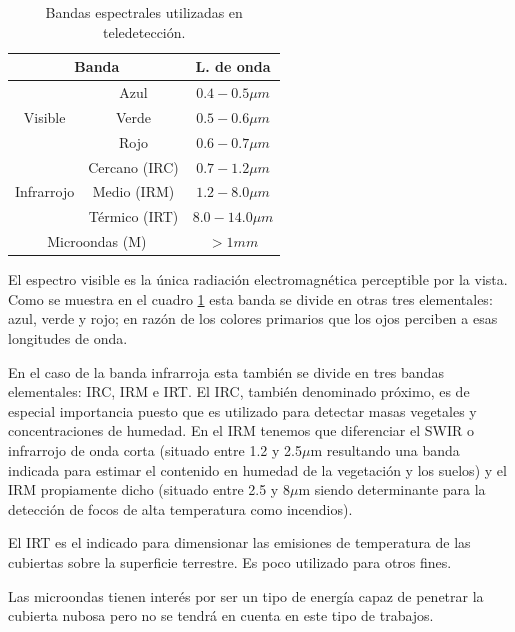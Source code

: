 \begin{table}[ht]
	\centering
	\caption[Bandas espectrales utilizadas en teledetección]{Bandas espectrales utilizadas en teledetección.}
	\begin{tabular}{|c|c|c|}
		\hline
		\multicolumn{2}{|c|}{\textbf{Banda}} & \textbf{L. de onda} \\
		\hline	\hline
		\multirow{3}{*}{Visible} & Azul & $0.4-0.5{\mu}m$ \\
		\cline{2-3}
		& Verde & $0.5-0.6{\mu}m$ \\
		\cline{2-3}
		& Rojo & $0.6-0.7{\mu}m$ \\
		\hline
		\multirow{3}{*}{Infrarrojo} & Cercano (IRC) & $0.7-1.2{\mu}m$ \\
		\cline{2-3}
		& Medio (IRM) & $1.2-8.0{\mu}m$ \\
		\cline{2-3}
		& Térmico (IRT) & $8.0-14.0{\mu}m$ \\
		\hline
		\multicolumn{2}{|c|}{Microondas (M)} & $>1mm$\\
		\hline
	\end{tabular}
	\label{tab:bandas}
\end{table}

El espectro visible es la única radiación electromagnética perceptible por la vista. Como se muestra en el cuadro \ref{tab:bandas} esta banda se divide en otras tres elementales: azul, verde y rojo; en razón de los colores primarios que los ojos perciben a esas longitudes de onda.\Sep

En el caso de la banda infrarroja esta también se divide en tres bandas elementales: \ac{IRC}, \ac{IRM} e \ac{IRT}. El \ac{IRC}, también denominado próximo, es de especial importancia puesto que es utilizado para detectar masas vegetales y concentraciones de humedad. En el \ac{IRM} tenemos que diferenciar el \ac{SWIR} o infrarrojo de onda corta (situado entre 1.2 y 2.5$\mu$m resultando una banda indicada para estimar el contenido en humedad de la vegetación y los suelos) y el \ac{IRM} propiamente dicho (situado entre 2.5 y 8$\mu$m siendo determinante para la detección de focos de alta temperatura como incendios).\Sep

El \ac{IRT} es el indicado para dimensionar las emisiones de temperatura de las cubiertas sobre la superficie terrestre. Es poco utilizado para otros fines.\Sep

Las microondas tienen interés por ser un tipo de energía capaz de penetrar la cubierta nubosa pero no se tendrá en cuenta en este tipo de trabajos.\Sep

